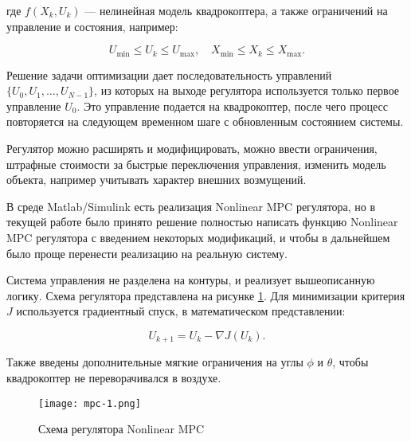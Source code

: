 где \(f(X_k, U_k)\) — нелинейная модель квадрокоптера, а также ограничений на управление и состояния, например:

\begin{equation}
    U_{\text{min}} \leq U_k \leq U_{\text{max}}, \quad X_{\text{min}} \leq X_k \leq X_{\text{max}}.
\end{equation}

Решение задачи оптимизации дает последовательность управлений \(\{U_0, U_1, \dots, U_{N-1}\}\), из которых на выходе регулятора используется только первое управление \(U_0\). Это управление подается на квадрокоптер, после чего процесс повторяется на следующем временном шаге с обновленным состоянием системы.


Регулятор можно расширять и модифицировать, можно ввести ограничения, штрафные стоимости за быстрые переключения управления,
изменить модель объекта, например учитывать характер внешних возмущений.


В среде Matlab/Simulink есть реализация Nonlinear MPC регулятора, но в текущей работе было принято решение полностью написать 
функцию Nonlinear MPC регулятора с введением некоторых модификаций, и чтобы в дальнейшем было проще перенести 
реализацию на реальную систему.

Система управления не разделена на контуры, 
и реализует вышеописанную логику. Схема регулятора представлена на рисунке \ref{fig:mpc-1}. 
Для минимизации критерия \(J\) используется градиентный спуск, в математическом представлении:

\begin{equation}
    U_{k+1} = U_k - \nabla J(U_k).
\end{equation}

Также введены дополнительные мягкие ограничения на углы \(\phi\) и \(\theta\), чтобы квадрокоптер
не переворачивался в воздухе.

\begin{figure}[ht]
    \centering
    \texttt{[image: mpc-1.png]}
    \caption{Схема регулятора Nonlinear MPC}
    \label{fig:mpc-1}
\end{figure}


\endinput